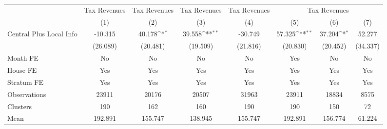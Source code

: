 {
\def\sym#1{\ifmmode^{#1}\else\(^{#1}\)\fi}
\begin{tabular}{l*{7}{c}}
\hline\hline
                &\multicolumn{1}{c}{Tax Revenues}&\multicolumn{1}{c}{Tax Revenues}&\multicolumn{1}{c}{Tax Revenues}&\multicolumn{1}{c}{Tax Revenues}&\multicolumn{3}{c}{Tax Revenues}                        \\
                &\multicolumn{1}{c}{(1)}         &\multicolumn{1}{c}{(2)}         &\multicolumn{1}{c}{(3)}         &\multicolumn{1}{c}{(4)}         &\multicolumn{1}{c}{(5)}         &\multicolumn{1}{c}{(6)}         &\multicolumn{1}{c}{(7)}         \\
\hline
Central Plus Local Info&  -10.315         &   40.178\sym{*}  &   39.558\sym{**} &  -30.749         &   57.325\sym{**} &   37.204\sym{*}  &   52.277         \\
                & (26.089)         & (20.481)         & (19.509)         & (21.816)         & (20.830)         & (20.452)         & (34.337)         \\
Month FE        &       No         &       No         &       No         &       No         &      Yes         &       No         &       No         \\
House FE        &      Yes         &      Yes         &      Yes         &      Yes         &      Yes         &      Yes         &      Yes         \\
Stratum FE      &      Yes         &      Yes         &      Yes         &      Yes         &      Yes         &      Yes         &      Yes         \\
\hline
Observations    &    23911         &    20176         &    20507         &    31963         &    23911         &    18834         &     8575         \\
Clusters        &      190         &      162         &      160         &      190         &      190         &      150         &       72         \\
Mean            &  192.891         &  155.747         &  138.945         &  155.747         &  192.891         &  156.774         &   61.224         \\
\hline\hline
\end{tabular}
}
